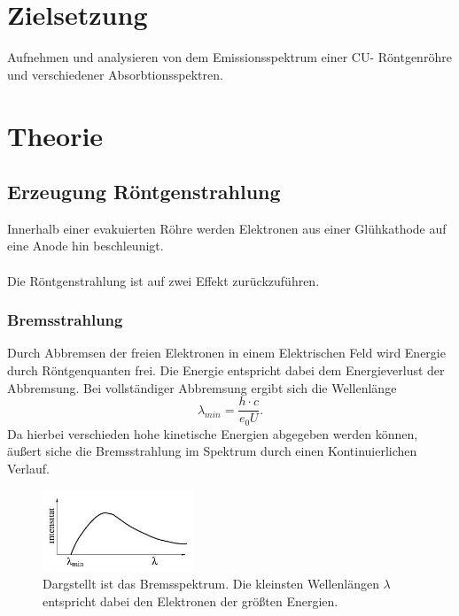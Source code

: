 \newpage
\section*{Zielsetzung}
Aufnehmen und analysieren von dem Emissionsspektrum einer CU-
Röntgenröhre und verschiedener Absorbtionsspektren.
\section{Theorie}
\subsection{Erzeugung Röntgenstrahlung}
Innerhalb einer evakuierten Röhre werden Elektronen aus einer Glühkathode
auf eine Anode hin beschleunigt.\\
\\Die Röntgenstrahlung ist auf zwei Effekt zurückzuführen.

\subsubsection*{Bremsstrahlung}
Durch Abbremsen der freien Elektronen in einem Elektrischen Feld 
wird Energie durch Röntgenquanten frei. Die Energie entspricht dabei
dem Energieverlust der Abbremsung. Bei vollständiger Abbremsung ergibt
sich die Wellenlänge
\begin{equation}
    \lambda_{min}=\frac{h \cdot c}{e_0U}.
    \label{eqn:minW}
\end{equation}
Da hierbei verschieden hohe kinetische Energien abgegeben werden können,
äußert siche die Bremsstrahlung im Spektrum durch einen Kontinuierlichen
Verlauf.
\begin{figure}
    \centering
    \includegraphics[width=0.4\textwidth]{plots/wellenberg.jpg}
    \caption{Dargstellt ist das Bremsspektrum. Die kleinsten Wellenlängen $\lambda$
    entspricht dabei den Elektronen der größten Energien.\cite[1]{anleitung}}
\end{figure}


